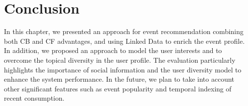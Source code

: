 \section{Conclusion}   \label{sec:conclusion}
In this chapter, we presented an approach for event recommendation combining both CB and CF advantages, and using Linked Data to enrich the event profile. In addition, we proposed an approach to model the user interests and to overcome the topical diversity in the user profile. The evaluation particularly highlights the importance of social information and the user diversity model to enhance the system performance. In the future, we plan to take into account other significant features such as event popularity and temporal indexing of recent consumption.
